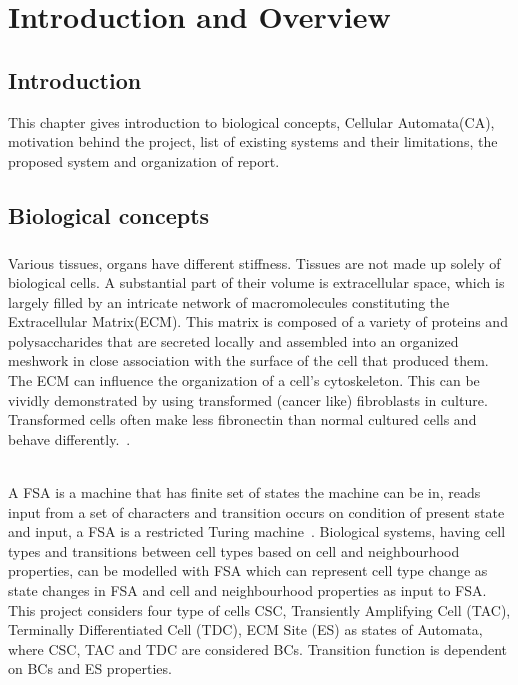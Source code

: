 \chapter{Introduction and Overview}

\section{Introduction}
This chapter gives introduction to biological concepts, Cellular Automata(CA), motivation behind the project, list of existing systems and their limitations, the proposed system and organization of report.

\section{Biological concepts}

\paragraph{}
Various tissues, organs have different stiffness. Tissues are not made up solely of biological cells.
A substantial part of their volume is extracellular space, which is largely filled by an intricate network of macromolecules constituting the Extracellular Matrix(ECM). 
This matrix is composed of a variety of proteins and polysaccharides that are secreted locally and assembled into an organized meshwork in close association with the surface of the cell that produced them.
The ECM can influence the organization of a cell's cytoskeleton. This can be vividly demonstrated by using transformed (cancer like) fibroblasts in culture. 
Transformed cells often make less fibronectin than normal cultured cells and behave differently.~\cite{MolecularBiologyOfTheCell}.


~\\A FSA is a machine that has finite set of states the machine can be in, reads input from a set of characters and transition occurs on condition of present state and input, 
a FSA is a restricted Turing machine~\cite{FiniteStateMachine}.
Biological systems, having cell types and transitions between cell types based on cell and neighbourhood properties, can be modelled with FSA which can represent cell type change as state changes in FSA and cell and neighbourhood properties as input to FSA.
This project considers four type of cells CSC, Transiently Amplifying Cell (TAC), Terminally Differentiated Cell (TDC), ECM Site (ES) as states of Automata, 
where CSC, TAC and TDC are considered BCs. Transition function is dependent on BCs and ES properties.

